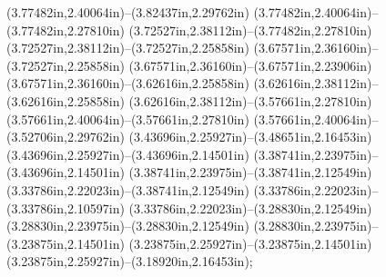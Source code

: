(3.77482in,2.40064in)--(3.82437in,2.29762in) (3.77482in,2.40064in)--(3.77482in,2.27810in) (3.72527in,2.38112in)--(3.77482in,2.27810in) (3.72527in,2.38112in)--(3.72527in,2.25858in) (3.67571in,2.36160in)--(3.72527in,2.25858in) (3.67571in,2.36160in)--(3.67571in,2.23906in) (3.67571in,2.36160in)--(3.62616in,2.25858in) (3.62616in,2.38112in)--(3.62616in,2.25858in) (3.62616in,2.38112in)--(3.57661in,2.27810in) (3.57661in,2.40064in)--(3.57661in,2.27810in) (3.57661in,2.40064in)--(3.52706in,2.29762in) (3.43696in,2.25927in)--(3.48651in,2.16453in) (3.43696in,2.25927in)--(3.43696in,2.14501in) (3.38741in,2.23975in)--(3.43696in,2.14501in) (3.38741in,2.23975in)--(3.38741in,2.12549in) (3.33786in,2.22023in)--(3.38741in,2.12549in) (3.33786in,2.22023in)--(3.33786in,2.10597in) (3.33786in,2.22023in)--(3.28830in,2.12549in) (3.28830in,2.23975in)--(3.28830in,2.12549in) (3.28830in,2.23975in)--(3.23875in,2.14501in) (3.23875in,2.25927in)--(3.23875in,2.14501in) (3.23875in,2.25927in)--(3.18920in,2.16453in);
